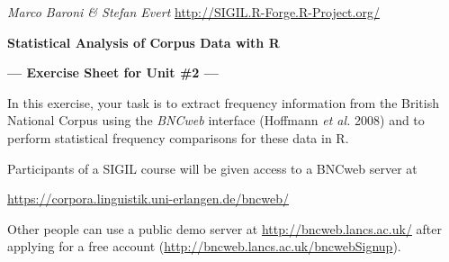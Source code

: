 \documentclass[a4paper,12pt]{article}
\begin{document}
\emph{Marco Baroni \& Stefan Evert} \hfill %
{\small \url{http://SIGIL.R-Forge.R-Project.org/}}

\begin{center}
  \textbf{\large Statistical Analysis of Corpus Data with R}

  \textbf{\large --- Exercise Sheet for Unit \#2 ---}
\end{center}


In this exercise, your task is to extract frequency information from the British National Corpus using the \emph{BNCweb} interface (Hoffmann
\emph{et al.} 2008) and to perform statistical frequency comparisons for these data in R.

Participants of a SIGIL course will be given access to a BNCweb server at
\begin{center}
  \url{https://corpora.linguistik.uni-erlangen.de/bncweb/}
\end{center}
Other people can use a public demo server at \url{http://bncweb.lancs.ac.uk/}
after applying for a free account (\url{http://bncweb.lancs.ac.uk/bncwebSignup}).
\end{document}
